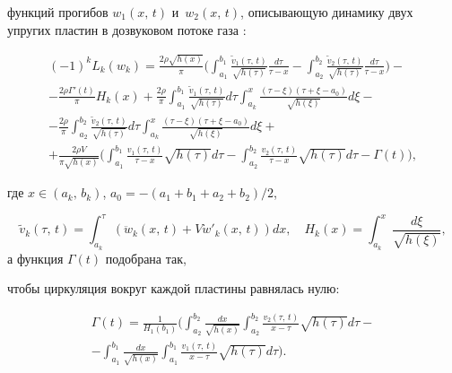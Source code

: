 функций прогибов $w_1(x,\,t)$ и~$w_2 (x,\,t)$, описывающую динамику двух упругих пластин в дозвуковом потоке газа \cite{velmBibl3}:

\begin{multline}

(- 1)^k L_k (w_k) = \frac{2 \rho \sqrt

{h (x)}}{\pi} \biggl( \int_{a_1}^{b_1} \frac{\tilde {v}_1 (\tau,\,t)}{\sqrt {h (\tau)}} \frac{d\tau}{\tau - x} - \int _{a_2}^{b_2}

\frac{\tilde {v}_2 (\tau,\,t)}{\sqrt {h (\tau )}} \frac{d\tau}{\tau - x}  \biggr) - \\

\label{ank11:velm06}

 -\frac{2 \rho \Gamma' ( t )}{\pi} H_k (x)+  \frac{2 \rho}{\pi} \int _{a_1} ^{b_1}

 \frac{ \tilde {v}_1 (\tau,\,t )}{\sqrt {h (\tau)}} d \tau  

 \int _{a_k}^x \frac{(\tau - \xi ) (\tau + \xi - a_0)}  {\sqrt {h (\xi)}}d\xi  - \\

-  \frac{2 \rho}{\pi} \int _{a_2} ^{b_2}  \frac{\tilde{v}_2 (\tau,\,t)}{\sqrt {h (\tau)}} d \tau

\int _{a_k}^x \frac{(\tau - \xi) (\tau + \xi - a_0)}{\sqrt {h (\xi)}} d\xi + \\

+ \frac{2 \rho V}{\pi \sqrt {h (x)}} \biggl( 

\int _{a_1}^{b_1}  \frac{v_1 (\tau,\,t )}{\tau - x} \sqrt {h (\tau)} d\tau  

-\int _{a_2} ^{b_2}  \frac{v_2 (\tau,\,t)}{\tau - x} \sqrt {h (\tau)} d\tau   - \Gamma (t)

\biggr), 

\end{multline}

где  $x \in (a_k,\,b_k)$,  $a_{0} = - (a_1 +  b_1 + a_2 + b_2)/2$,

$$\tilde {v}_k (\tau,\,t) = \int _{a_k}^\tau  \left( \ddot w_k (x,\,t) + V \dot {w}'_k (x,\,t) \right)dx,\quad H_k(x)=\int _{a_k}^x \frac{d\xi}{\sqrt {h (\xi)}},$$  а функция $\Gamma (t)$ подобрана так,

чтобы циркуляция вокруг каждой пластины равнялась нулю:

\begin{multline*}

\Gamma (t) =\frac{1}{H_1(b_1)} \biggl( \int _{a_2}^{b_2} \frac{dx}{\sqrt {h (x)}} \int _{a_2}^{b_2}

\frac{v_2 (\tau,\,t)}{x - \tau} \sqrt{h (\tau)} d\tau  - \\ - \int _{a_1}^{b_1}\frac{dx}{\sqrt {h (x)}}

\int _{a_1}^{b_1}  \frac{v_1 (\tau,\,t)}{x - \tau} \sqrt {h (\tau)} d\tau \biggr).

\end{multline*}



